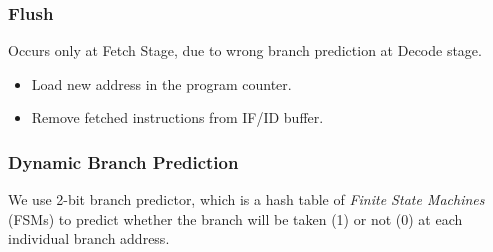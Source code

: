 \documentclass[12pt]{report}
\begin{document}
\subsubsection{Flush}
Occurs only at Fetch Stage, due to wrong branch prediction at Decode stage.
\begin{itemize}
    \item Load new address in the program counter.
    \item Remove fetched instructions from IF/ID buffer.
\end{itemize}

\subsubsection{Dynamic Branch Prediction}
We use 2-bit branch predictor, which is a hash table of \emph{Finite State Machines} (FSMs) to predict whether the branch will be taken (1) or not (0) at each individual branch address.
\end{document}
